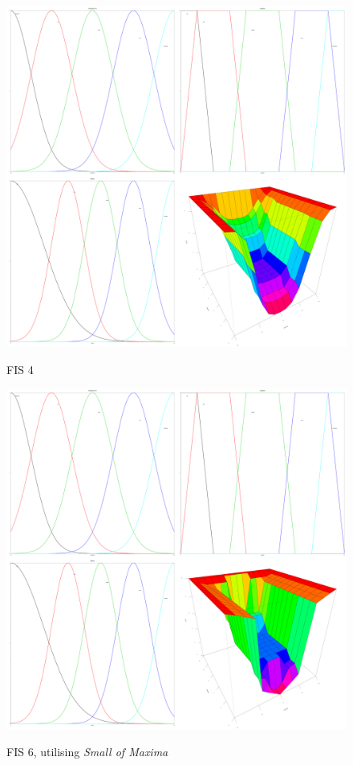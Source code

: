 \documentclass[12pt, a4paper]{report}
\begin{document}
\begin{figure}[ht]
  \centering
  \caption{FIS 4}
  \includegraphics[width=0.4\textheight]{membershipFns04.png}
  \label{fig:membershipfns4}
\end{figure}

\begin{figure}[ht]
  \centering
  \caption{FIS 6, utilising \emph{Small of Maxima}}
  \includegraphics[width=0.4\textheight]{membershipFns06.png}
  \label{fig:membershipfns6}
\end{figure}
\end{document}
